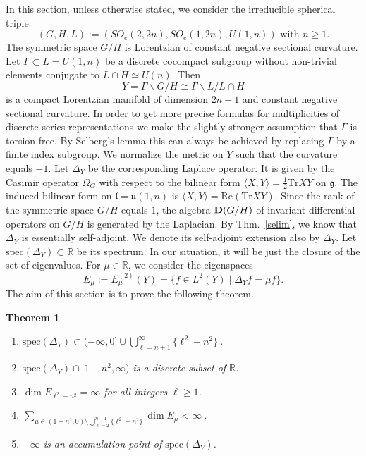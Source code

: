 \documentclass[10]{amsart}
\newtheorem{thm}{Theorem}[section]
\theoremstyle{remark}
\theoremstyle{definition}
\numberwithin{equation}{section}
\newcommand{\Tr}{\text{Tr}}
\newcommand{\spec}{{\mathrm{spec}}}
\newcommand{\fg}{{\mathfrak g}}
\newcommand{\fl}{{\mathfrak l}}
\newcommand{\fu}{{\mathfrak u}}
\newcommand{\Cal}{\mathcal}
\newcommand{\beu}{\begin{equation*}}
\newcommand{\defn}{{:=}}
\begin{document}
{In this section, unless otherwise stated, we consider the irreducible spherical triple 
%
\beu
(G,H,L)\defn(SO_{e}(2,2n),SO_{e}(1,2n),U(1,n))\text{ with }n\geq 1. 
\end{equation*}
%
The symmetric space $G/H$ is Lorentzian of constant negative sectional curvature. Let $\Gamma\subset L=U(1,n)$ be a discrete 
cocompact subgroup without non-trivial elements conjugate to $L\cap H\simeq U(n)$. Then 
%
\beu
Y=\Gamma\backslash G/H \cong \Gamma\backslash L/L\cap H
\end{equation*}
%
is a compact Lorentzian manifold of dimension $2n+1$ and constant negative sectional curvature. In order to get more precise formulas for multiplicities of discrete series representations
we make the slightly stronger assumption that $\Gamma$ is torsion free. By Selberg's lemma
\cite{Rat06} this can always be achieved by replacing $\Gamma$ by a finite index subgroup. We normalize the metric on $Y$ such that the curvature 
equals $-1$. Let $\Delta_Y$ be the corresponding Laplace operator. It is given by the Casimir operator $\Omega_G$ with respect to the bilinear form 
$\langle X,Y\rangle = \frac{1}{2}\Tr XY$ on $\fg$. The induced bilinear form on $\fl=\fu(1,n)$ is $\langle X,Y\rangle = \mathrm{Re} (\Tr XY)$.
Since the rank of the symmetric space $G/H$ equals $1$, the algebra ${\bf D}(G/H)$ of invariant differential operators on $G/H$ is generated by the 
Laplacian. By Thm.~\ref{selim}, we know that $\Delta_Y$ is essentially self-adjoint. 
We denote its self-adjoint extension 
also by $\Delta_Y$. Let $\spec(\Delta_Y)\subset\mathbb{R}$ be its spectrum. In our situation, it will be just the closure of the set of eigenvalues. For $\mu\in\mathbb{R}$, we consider 
the eigenspaces 
%
\beu
E_\mu:=E_\mu^{(2)}(Y)=\{f\in L^2(Y)\mid \Delta_Yf=\mu f\}. 
\end{equation*}
%
The aim of this section is to prove the following theorem.
%
\begin{thm}\label{something}\mbox{}
\begin{enumerate}
\item $\displaystyle\spec(\Delta_Y)\subset (-\infty,0]\cup\bigcup_{\ell=n+1}^\infty \{\ell^2-n^2\}\ .$
\item $\spec(\Delta_Y)\cap [1-n^2,\infty)$ is a discrete subset of $\mathbb{R}$.
\item $\dim E_{\ell^2-n^2} =\infty$ for all integers $\ell \geq 
1$.
\item $\displaystyle \sum_{\mu\in (1-n^2,0)\setminus \bigcup_{\ell=2}^{n-1} \{\ell^2-n^2\}} \dim E_\mu <\infty\ .$
\\
\item $-\infty$ is an accumulation point of $\spec(\Delta_Y)$.
\end{enumerate}
\end{thm}
%

}
\end{document}
